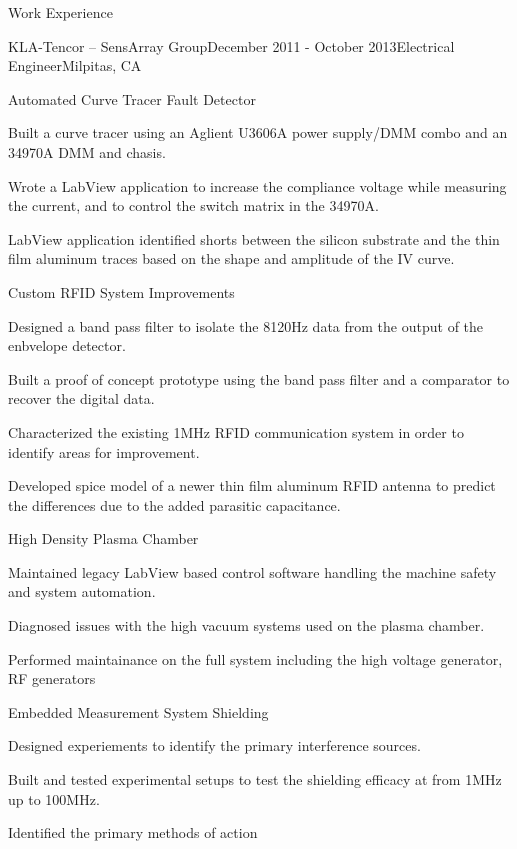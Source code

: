 \documentclass{resume} %
\begin{document}
\begin{rSection}{Work Experience}
\begin{rSubsection2}{KLA-Tencor -- SensArray Group}{December 2011 - October 2013}{Electrical Engineer}{Milpitas, CA}
\begin{rWorkProject}{Automated Curve Tracer Fault Detector}
\item Built a curve tracer using an Aglient U3606A power supply/DMM combo and an 34970A DMM and chasis.
\item Wrote a LabView application to increase the compliance voltage while measuring the current, and to control the switch matrix in the 34970A.
\item LabView application identified shorts between the silicon substrate and the thin film aluminum traces based on the shape and amplitude of the IV curve.
\end{rWorkProject}

\begin{rWorkProject}{Custom RFID System Improvements}
\item Designed a band pass filter to isolate the 8120Hz data from the output of the enbvelope detector.
\item Built a proof of concept prototype using the band pass filter and a comparator to recover the digital data.
\item Characterized the existing 1MHz RFID communication system in order to identify areas for improvement.
\item Developed spice model of a newer thin film aluminum RFID antenna to predict the differences due to the added parasitic capacitance. 
\end{rWorkProject}

\begin{rWorkProject}{High Density Plasma Chamber}
\item Maintained legacy LabView based control software handling the machine safety and system automation.
\item Diagnosed issues with the high vacuum systems used on the plasma chamber.
\item Performed maintainance on the full system including the high voltage generator, RF generators 
\end{rWorkProject}

\begin{rWorkProject}{Embedded Measurement System Shielding}
\item Designed experiements to identify the primary interference sources.
\item Built and tested experimental setups to test the shielding efficacy at from 1MHz up to 100MHz.
\item Identified the primary methods of action 
\end{rWorkProject}


\end{rSubsection2}
\end{rSection}
\end{document}
